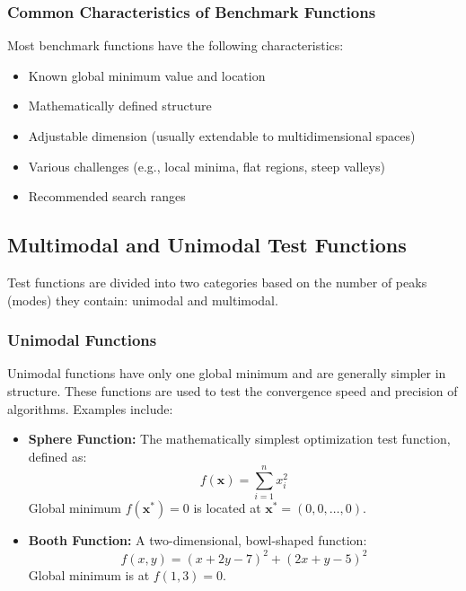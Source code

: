 \subsubsection{Common Characteristics of Benchmark Functions}

Most benchmark functions have the following characteristics:

\begin{itemize}
    \item Known global minimum value and location
    \item Mathematically defined structure
    \item Adjustable dimension (usually extendable to multidimensional spaces)
    \item Various challenges (e.g., local minima, flat regions, steep valleys)
    \item Recommended search ranges
\end{itemize}

\subsection{Multimodal and Unimodal Test Functions}

Test functions are divided into two categories based on the number of peaks (modes) they contain: unimodal and multimodal.

\subsubsection{Unimodal Functions}

Unimodal functions have only one global minimum and are generally simpler in structure. These functions are used to test the convergence speed and precision of algorithms. Examples include:

\begin{itemize}
    \item \textbf{Sphere Function:} The mathematically simplest optimization test function, defined as:
    \begin{equation}
        f(\mathbf{x}) = \sum_{i=1}^{n} x_i^2
    \end{equation}
    Global minimum $f(\mathbf{x}^*) = 0$ is located at $\mathbf{x}^* = (0, 0, \ldots, 0)$.
    
    \item \textbf{Booth Function:} A two-dimensional, bowl-shaped function:
    \begin{equation}
        f(x, y) = (x + 2y - 7)^2 + (2x + y - 5)^2
    \end{equation}
    Global minimum is at $f(1, 3) = 0$.
\end{itemize}

